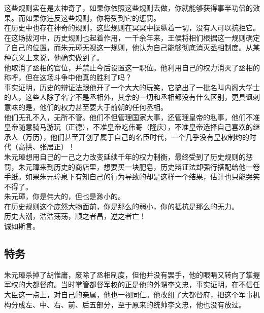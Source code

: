 \begin{multicols}{\theparacolNo}
这些规则实在是太神奇了，如果你依照这些规则去做，你就能够获得事半功倍的效果。而如果你违反这些规则，你将受到它的惩罚。\\

在历史中也存在神奇的规则，这些规则在冥冥中操纵着一切，没有人可以抗拒它。\\

在这场拔河中，历史规则也起着作用，一千余年来，王侯将相们根据这一规则确定了自己的位置，而朱元璋无视这一规则，他认为自己能够彻底消灭丞相制度。从某种意义上来说，他确实做到了。\\

他取消了丞相的官位，并禁止今后设置这一职位。他利用自己的权力消灭了丞相的称呼，但在这场斗争中他真的胜利了吗？\\

事实证明，历史的辩证法跟他开了一个大大的玩笑，它搞出了一批名叫内阁大学士的人，这些人除了名字不是丞相外，其余的一切和丞相都没有什么区别，更具讽刺意味的是，他们的权力甚至要大于前朝的任何丞相。\\

他们无孔不入，无所不管。他们不但管理国家大事，还管理皇帝的私事，他们不准皇帝随意骑马游玩（正德），不准皇帝吃伟哥（隆庆），不准皇帝选择自己喜欢的继承人（万历），他们甚至开创了属于自己的名臣时代，一个几乎没有皇权制约的时代（高拱、张居正）！\\

朱元璋想用自己的一己之力改变延续千年的权力制衡，最终受到了历史规则的惩罚，朱元璋来到历史的商店里，想要买一块肥皂，历史辩证法却强行搭配给他一卷手纸。如果朱元璋泉下有知自己的行为导致的却是这样一个结果，估计也只能哭笑不得了。\\

朱元璋，你是伟大的，但也是渺小的。\\

在历史规则这个庞然大物面前，你是那么的弱小，你的抵抗是那么的无力。\\

历史大潮，浩浩荡荡，顺之者昌，逆之者亡！\\

诚如斯言。\\

\subsection{特务}
朱元璋杀掉了胡惟庸，废除了丞相制度，但他并没有罢手，他的眼睛又转向了掌握军权的大都督府。当时掌管都督军权的正是他的外甥李文忠，事实证明，在不信任大臣这一点上，对自己的亲属，他也一视同仁。他改组了大都督府，把这个军事机构分成左、中、右、前、后五部分，至于原来的统帅李文忠，他也没有放过。\\


\end{multicols}

